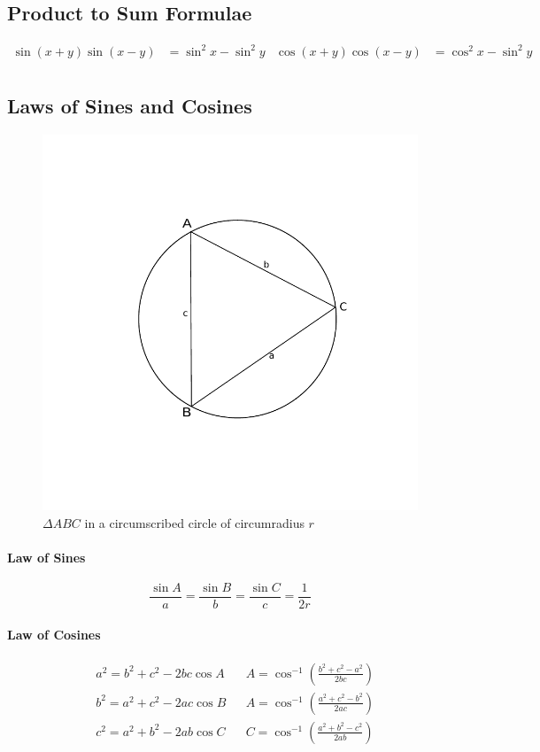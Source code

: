 \subsection{Product to Sum Formulae}
\begin{align*}
\sin(x + y) \sin(x - y) &= \sin^2x - \sin^2y &
\cos(x + y) \cos(x - y) &=\cos^2x - \sin^2y \\
\end{align*}
\subsection{Laws of Sines and Cosines}
\begin{figure}[H]
	\centering
	\includegraphics[scale=1]{figures/triangle}
	\caption{\label{triangle}$\Delta ABC$ in a circumscribed circle of circumradius $r$}
\end{figure}
\paragraph{Law of Sines}
$$\frac{\sin A}{a} = \frac{\sin B}{b} = \frac{\sin C}{c} = \frac{1}{2r}$$
\paragraph{Law of Cosines}
\begin{align*}
&a^2 = b^2 + c^2 - 2bc\cos A & &A =\cos^{-1}{\left(\frac{b^2 + c^2 - a^2}{2bc}\right)} \\
&b^2 = a^2 + c^2 - 2ac\cos B & &A =\cos^{-1}{\left(\frac{a^2 + c^2 - b^2}{2ac}\right)} \\
&c^2 = a^2 + b^2 - 2ab\cos C & &C =\cos^{-1}{\left(\frac{a^2 + b^2 - c^2}{2ab}\right)} \\
\end{align*}

